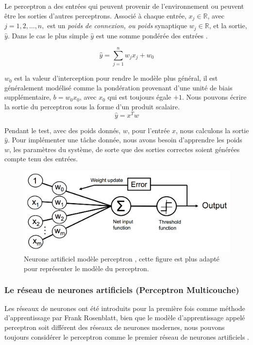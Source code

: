 	
	
	Le perceptron a des entrées qui peuvent provenir de l'environnement ou peuvent être les sorties d'autres perceptrons.
	Associé à chaque entrée, $ x_j \in \mathbb{R}$, avec $ j = 1,2, \dots , n, $ est un \textit{poids de connexion, ou poids} synaptique $w_j \in \mathbb{R}$, et la sortie, $\hat{y}$. Dans le cas le plus simple $\hat{y}$ est une somme pondérée des entrées \cite{alpaydin2010introduction}.
	
	$$ {\hat{y} = \sum _{j=1}^{n}w_{j}x_{j} + w_0} $$
	
	$w_0$ est la valeur d'interception pour rendre le modèle plus général, il est généralement modélisé comme la pondération provenant d'une unité de biais supplémentaire, $b = w_0 x_0$, avec $x_0$ qui est toujours égale $+1$. Nous pouvons écrire la sortie du perceptron sous la forme d'un produit scalaire.
	$$ \hat{y} = x^Tw $$
	
	Pendant le test, avec des poids donnés, $w$, pour l'entrée $x$, nous calculons la sortie $\hat{y}$. Pour implémenter une tâche donnée, nous avons besoin d'apprendre les poids $w$, les paramètres du système, de sorte que des sorties correctes soient générées compte tenu des entrées.
	
	\begin{figure}[hth]%
		\centering
		\includegraphics[width=\textwidth]{images/perceptron_neuron.png}
		\caption[Neurone artificiel modèle perceptron.]{Neurone artificiel modèle perceptron \cite{ml2008python}, cette figure est plus adapté pour représenter le modèle du perceptron.}
		\label{fig:perceptron_neuron}
	\end{figure}

	
	
	\subsubsection{Le réseau de neurones artificiels (Perceptron Multicouche)}
	
	Les réseaux de neurones ont été introduits pour la première fois comme méthode d'apprentissage par Frank Rosenblatt, bien que le modèle d'apprentissage appelé perceptron soit différent des réseaux de neurones modernes, nous pouvons toujours considérer le perceptron comme le premier réseau de neurones artificiels \cite{sarkar2017practical}.
	
